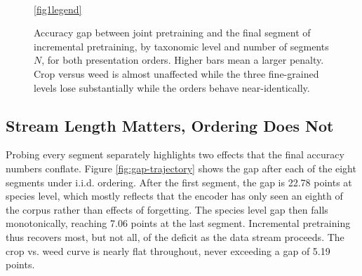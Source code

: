 \documentclass[english]{lni}
\begin{document}
\begin{figure}[tb]
\centering
{}\\
\ref{fig1legend}
\caption{Accuracy gap between joint pretraining and the final segment of incremental pretraining, by taxonomic level and number of segments $N$, for both presentation orders. Higher bars mean a larger penalty. Crop versus weed is almost unaffected while the three fine-grained levels lose substantially while the orders behave near-identically.}
\label{fig:gap-granularity}
\end{figure}

\subsection{Stream Length Matters, Ordering Does Not}\label{sec:trajectory}

Probing every segment separately highlights two effects that the final accuracy numbers conflate. Figure \ref{fig:gap-trajectory} shows the gap after each of the eight segments under i.i.d. ordering. After the first segment, the gap is 22.78 points at species level, which mostly reflects that the encoder has only seen an eighth of the corpus rather than effects of forgetting. The species level gap then falls monotonically, reaching 7.06 points at the last segment. Incremental pretraining thus recovers most, but not all, of the deficit as the data stream proceeds. The crop vs. weed curve is nearly flat throughout, never exceeding a gap of 5.19 points.
\end{document}
